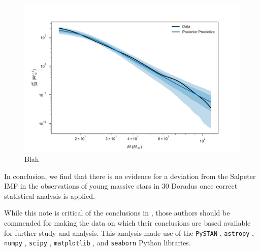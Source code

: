 \documentclass[apjl]{emulateapj}
\begin{document}
\begin{figure}
    		    		\includegraphics[trim={0cm 0cm 0cm 0cm},clip,scale=0.4]{dNdm-ppc-band.pdf}
    		\caption{Blah}\label{fig:PPC}
\end{figure}


In conclusion, we find that there is no evidence for a deviation from the Salpeter IMF in the observations of young massive stars in 30 Doradus once correct statistical analysis is applied.

\acknowledgments

While this note is critical of the conclusions in \citet{Schneider:2018}, those
authors should be commended for making the data on which their conclusions are
based available for further study and analysis.  This analysis made use of the \texttt{PySTAN} \citep{PySTAN}, \texttt{astropy} \citep{XXX}, \texttt{numpy} \citep{XXX}, \texttt{scipy} \citep{XXX}, \texttt{matplotlib} \citep{XXX}, and \texttt{seaborn} \citep{XXX} Python libraries.



\end{document}
